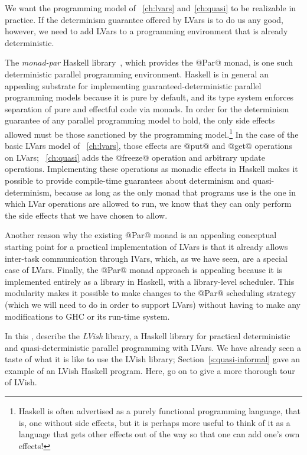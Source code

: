 We want the programming model of ~\ref{ch:lvars}
and~\ref{ch:quasi} to be realizable in practice.  If the determinism
guarantee offered by LVars is to do us any good, however, we need to
add LVars to a programming environment that is already deterministic.

The \emph{monad-par} Haskell library~\cite{monad-par}, which provides
the @Par@ monad, is one such deterministic parallel programming
environment.  Haskell is in general an appealing substrate for
implementing guaranteed-deterministic parallel programming models
because it is pure by default, and its type system enforces separation
of pure and effectful code via monads.  In order for the determinism
guarantee of any parallel programming model to hold, the only side
effects allowed must be those sanctioned by the programming
model.\footnote{Haskell is often advertised as a purely functional
programming language, that is, one without side effects, but it is
perhaps more useful to think of it as a language that gets other
effects out of the way so that one can add one's own effects!}  In the
case of the basic LVars model of ~\ref{ch:lvars}, those effects
are @put@ and @get@ operations on LVars;
 ~\ref{ch:quasi} adds
the @freeze@ operation and arbitrary update operations.  Implementing
these operations as monadic effects in Haskell makes it possible to
provide compile-time guarantees about determinism and
quasi-determinism, because as long as the only monad that programs use
is the one in which LVar operations are allowed to run, we know that
they can only perform the side effects that we have chosen to allow.

Another reason why the existing @Par@ monad is an appealing conceptual starting
point for a practical implementation of LVars is that it already allows
inter-task communication through IVars, which, as we have seen, are a
special case of LVars.
Finally, the @Par@ monad approach is appealing
because it is implemented entirely as a library in Haskell, with a
library-level scheduler.  This modularity makes it possible to make
changes to the @Par@ scheduling strategy (which we will need to do in
order to support LVars) without having to make any modifications to
GHC or its run-time system.

In this ,  describe the \emph{LVish} library, a Haskell
library for practical deterministic and quasi-deterministic parallel
programming with LVars.  We have already seen a taste of what it is
like to use the LVish library; Section~\ref{s:quasi-informal} gave an
example of an LVish Haskell program.  Here,  go on to give a
more thorough tour of LVish.
